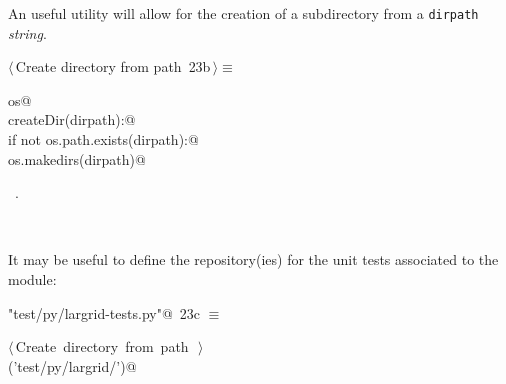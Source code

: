 \documentclass[11pt,oneside]{article}	%
\begin{document}
An useful utility will allow for the creation of a subdirectory from a \texttt{dirpath} \emph{string}.
\begin{flushleft} \small
\begin{minipage}{\linewidth} \label{scrap38}
\protect{}$\langle\,$Create directory from path\nobreak\ {\footnotesize 23b}$\,\rangle\equiv$
\vspace{-1ex}
\begin{list}{}{} \item
\mbox{}\verb@import os@\\
\mbox{}\verb@def createDir(dirpath):@\\
\mbox{}\verb@    if not os.path.exists(dirpath):@\\
\mbox{}\verb@        os.makedirs(dirpath)@\\
\mbox{}\verb@@{\NWsep}
\end{list}
\vspace{-1ex}
\footnotesize\addtolength{\baselineskip}{-1ex}
\begin{list}{}{\setlength{\itemsep}{-\parsep}\setlength{\itemindent}{-\leftmargin}}
\item \NWtxtMacroRefIn\ .
\end{list}
\end{minipage}\\[4ex]
\end{flushleft}

It may be useful to define the repository(ies) for the unit tests associated to the module:
\begin{flushleft} \small
\begin{minipage}{\linewidth} \label{scrap39}
\protect{}\verb@"test/py/largrid-tests.py"@\nobreak\ {\footnotesize 23c }$\equiv$
\vspace{-1ex}
\begin{list}{}{} \item
\mbox{}\verb@@\hbox{$\langle\,$Create directory from path\nobreak\ {\footnotesize {}}$\,\rangle$}\verb@@\\
\mbox{}\verb@createDir('test/py/largrid/')@\\
\mbox{}\verb@@{\NWsep}
\end{list}
\vspace{-2ex}
\end{minipage}\\[4ex]
\end{flushleft}
\end{document}
